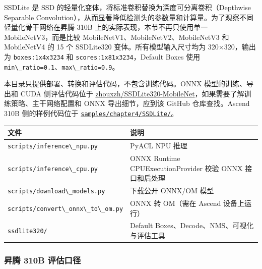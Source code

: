 SSDLite 是 SSD 的轻量化变体，将标准卷积替换为深度可分离卷积（Depthwise
Separable
Convolution），从而显著降低检测头的参数量和计算量。为了观察不同轻量化骨干网络在昇腾
310B 上的实际表现，本节不再只使用单一 MobileNetV3，而是比较
MobileNetV1、MobileNetV2、MobileNetV3 和 MobileNetV4 的 15 个 SSDLite320
变体。所有模型输入尺寸均为 320×320，输出为
\passthrough{\lstinline!boxes:1x4x3234!} 和
\passthrough{\lstinline!scores:1x81x3234!}，Default Boxes 使用
\passthrough{\lstinline!min\_ratio=0.1!}、\passthrough{\lstinline!max\_ratio=0.9!}。

本目录只提供部署、转换和评估代码，不包含训练代码。ONNX
模型的训练、导出和 CUDA 侧评估代码位于
\href{https://github.com/zhouxzh/SSDLite320-MobileNet}{zhouxzh/SSDLite320-MobileNet}，如果需要了解训练策略、主干网络配置和
ONNX 导出细节，应到该 GitHub 仓库查找。Ascend 310B 侧的样例代码位于
\href{https://github.com/zhouxzh/Ascend310/tree/master/samples/chapter4/SSDLite/}{\passthrough{\lstinline!samples/chapter4/SSDLite/!}}。

\begin{longtable}[]{@{}
  >{\raggedright\arraybackslash}p{}
  >{\raggedright\arraybackslash}p{}@{}}
\toprule\noalign{}
\begin{minipage}[b]{\linewidth}\raggedright
文件
\end{minipage} & \begin{minipage}[b]{\linewidth}\raggedright
说明
\end{minipage} \\
\midrule\noalign{}
\endhead
\bottomrule\noalign{}
\endlastfoot
\passthrough{\lstinline!scripts/inference\_npu.py!} & PyACL NPU 推理 \\
\passthrough{\lstinline!scripts/inference\_cpu.py!} & ONNX Runtime
CPUExecutionProvider 校验 ONNX 接口和后处理 \\
\passthrough{\lstinline!scripts/download\_models.py!} & 下载公开 ONNX/OM
模型 \\
\passthrough{\lstinline!scripts/convert\_onnx\_to\_om.py!} & ONNX 转
OM（需在 Ascend 设备上运行） \\
\passthrough{\lstinline!ssdlite320/!} & Default
Boxes、Decode、NMS、可视化与评估工具 \\
\end{longtable}

\subsubsection{昇腾 310B
评估口径}\label{ux6607ux817e-310b-ux8bc4ux4f30ux53e3ux5f84}

